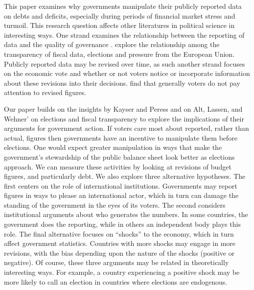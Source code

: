 \documentclass[]{article}
\begin{document}
This paper examines why governments manipulate their publicly reported data on debts and deficits, especially during periods of financial market stress and turmoil. This research question affects other literatures in political science in interesting ways. One strand examines the relationship between the reporting of data and the quality of governance \cite[e.g.]{Hollyer2014}. \cite{Alt2014} explore the relationship among the transparency of fiscal data, elections and pressure from the European Union. Publicly reported data may be revised over time, as such another strand focuses on the economic vote and whether or not voters notice or incorporate information about these revisions into their decisions. \cite{kayser_peress} find that generally voters do not pay attention to revised figures.

Our paper builds on the insights by Kayser and Peress and on Alt, Lassen, and Wehner’ on elections and fiscal transparency to explore the implications of their arguments for government action. If voters care most about reported, rather than actual, figures then governments have an incentive to manipulate them before elections. One would expect greater manipulation in ways that make the government's stewardship of the public balance sheet look better as elections approach. We can measure these activities by looking at revisions of budget figures, and particularly debt. We also explore three alternative hypotheses. The first centers on the role of international institutions. Governments may report figures in ways to please an international actor, which in turn can damage the standing of the government in the eyes of its voters. The second considers institutional arguments about who generates the numbers. In some countries, the government does the reporting, while in others an independent body plays this role. The final alternative focuses on ``shocks'' to the economy, which in turn affect government statistics. Countries with more shocks may engage in more revisions, with the bias depending upon the nature of the shocks (positive or negative). Of course, these three arguments may be related in theoretically interesting ways. For example, a country experiencing a positive shock may be more likely to call an election in countries where elections are endogenous.
\end{document}
